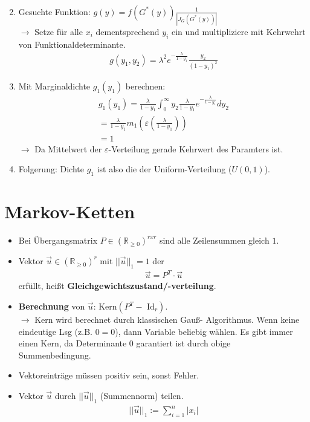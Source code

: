 \documentclass{article}
\begin{document}
\begin{enumerate}
\begin{align}
		\end{align}
	\item Gesuchte Funktion: $g(y) = f(G^*(y))\frac{1}{|J_G(G^*(y))|}$\\
		$\longrightarrow$ Setze für alle $x_i$ dementsprechend $y_i$ ein und multipliziere
		mit Kehrwehrt von Funktionaldeterminante.
		\begin{align}
			g(y_1,y_2) = \lambda^2e^{-\frac{\lambda}{1 - y_1}}\frac{y_2}{(1-y_1)^2}
		\end{align}
	\item Mit Marginaldichte $g_1(y_1)$ berechnen:\\
		\begin{align}
			g_1(y_1) = \frac{\lambda}{1 - y_1} \int^\infty_0 y_2\frac{\lambda}{1 - y_1}
			e^{-\frac{\lambda}{1 - y_1}} dy_2\\
			= \frac{\lambda}{1 - y_1} m_1 (\varepsilon(\frac{\lambda}{1 - y_1}))\\
			= 1
		\end{align}
		$\longrightarrow$ Da Mittelwert der $\varepsilon$-Verteilung gerade Kehrwert des
		Paramters ist.
	\item Folgerung: Dichte $g_1$ ist also die der Uniform-Verteilung ($U(0,1)$).
\end{enumerate}
\section{Markov-Ketten}
\begin{itemize}
	\item Bei Übergangsmatrix $P \in (\mathbb{R}_{\geq 0})^{r x r}$ sind alle Zeilensummen gleich $1$.
	\item Vektor $\vec{u} \in (\mathbb{R}_{\geq 0})^{r}$ mit $||\vec{u}||_1 = 1$
		der
		\begin{align}
			\vec{u} = P^T \cdot \vec{u}
		\end{align}
		erfüllt, heißt \textbf{Gleichgewichtszustand/-verteilung}.
	\item \textbf{Berechnung} von $\vec{u}$: $\text{Kern}(P^T - \text{ Id}_r)$.\\$\rightarrow$
		Kern wird berechnet durch klassischen Gauß- Algorithmus. Wenn keine
		eindeutige Lsg (z.B. $0 = 0$), dann Variable beliebig wählen. Es gibt
		immer einen Kern, da Determinante $0$ garantiert ist durch obige\\
		Summenbedingung.
	\item Vektoreinträge müssen positiv sein, sonst Fehler.
	\item Vektor $\vec{u}$ durch $||\vec{u}||_1$ (Summennorm) teilen.
		\begin{align}
			||\vec{u}||_1 := \sum^n_{i=1}|x_i|
		\end{align}
\end{itemize}
\end{document}
